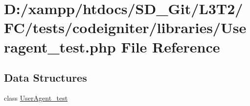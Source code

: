 \hypertarget{_useragent__test_8php}{}\section{D\+:/xampp/htdocs/\+S\+D\+\_\+\+Git/\+L3\+T2/\+F\+C/tests/codeigniter/libraries/\+Useragent\+\_\+test.php File Reference}
\label{_useragent__test_8php}
\subsection*{Data Structures}
\begin{DoxyCompactItemize}
\item 
class \hyperlink{class_user_agent__test}{User\+Agent\+\_\+test}
\end{DoxyCompactItemize}

